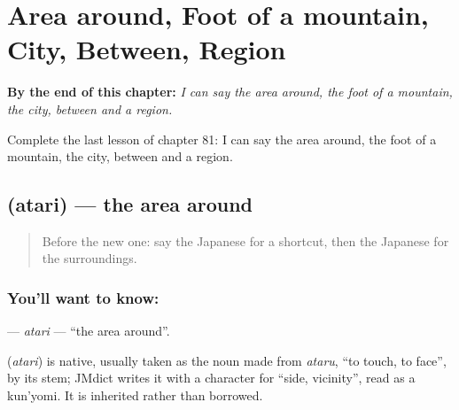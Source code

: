 
\chapter{Area around, Foot of a mountain, City, Between, Region}
\label{ch:ja-area-around-foot-of-a-mountain-city-between-region}

\begin{chapteropening}
\textbf{By the end of this chapter:} \emph{I can say the area around, the foot of a mountain, the city, between and a region.}

Complete the last lesson of chapter 81: I can say the area around, the foot of a mountain, the city, between and a region.
\end{chapteropening}

\section[\texorpdfstring{\ja{あたり} (atari)}{あたり (atari)}]{ (atari) — the area around}

\label{lesson:JA-C81-atari}



\begin{quote}
Before the new one: say the Japanese for a shortcut, then the Japanese for the surroundings.
\end{quote}

\subsection*{You'll want to know: }
\textbf{} — \emph{atari} — \textquotedblleft{}the area around\textquotedblright{}.

\begin{cousinweb}
\textbf{} (\emph{atari}) is native, usually taken as the noun made from \emph{ataru}, \textquotedblleft{}to touch, to face\textquotedblright{}, by its stem; JMdict writes it with a character for \textquotedblleft{}side, vicinity\textquotedblright{}, read as a kun'yomi. It is inherited rather than borrowed.
\end{cousinweb}

